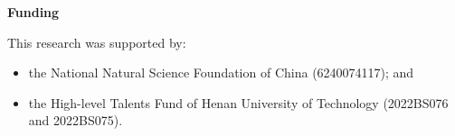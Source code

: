 \documentclass[11pt]{article}
\begin{document}
\begin{center}\textbf{Funding}\end{center}

This research was supported by:
\begin{itemize}
\item the National Natural Science Foundation of China (6240074117); and
\item the High-level Talents Fund of Henan University of Technology
(2022BS076 and 2022BS075).
\end{itemize}
\end{document}
